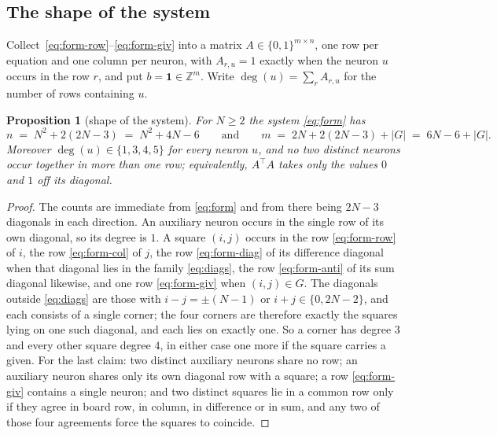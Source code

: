 \documentclass{easychair}
\newtheorem{proposition}[thm]{Proposition}
\begin{document}
\subsection*{The shape of the system}

Collect~\eqref{eq:form-row}--\eqref{eq:form-giv} into a matrix $A \in \{0,1\}^{m \times n}$,
one row per equation and one column per neuron, with $A_{r,u} = 1$ exactly when the neuron $u$
occurs in the row $r$, and put $b = \mathbf{1} \in \mathbb{Z}^{m}$. Write
$\deg(u) = \sum_{r} A_{r,u}$ for the number of rows containing $u$.

\begin{proposition}[shape of the system]\label{prop:sizes}
For $N \ge 2$ the system \eqref{eq:form} has
\begin{equation}\label{eq:sizes}
  n \;=\; N^{2} + 2(2N-3) \;=\; N^{2} + 4N - 6
  \qquad\text{and}\qquad
  m \;=\; 2N + 2(2N-3) + |G| \;=\; 6N - 6 + |G| .
\end{equation}
Moreover $\deg(u) \in \{1,3,4,5\}$ for every neuron $u$, and no two distinct neurons occur together
in more than one row; equivalently, $A^{\top}\!A$ takes only the values $0$ and $1$ off its
diagonal.
\end{proposition}

\begin{proof}
The counts are immediate from \eqref{eq:form} and from there being $2N-3$ diagonals in each
direction. An auxiliary neuron occurs in the single row of its own diagonal, so its degree is $1$. A
square $(i,j)$ occurs in the row \eqref{eq:form-row} of $i$, the row \eqref{eq:form-col} of $j$, the
row \eqref{eq:form-diag} of its difference diagonal when that diagonal lies in the family
\eqref{eq:diags}, the row \eqref{eq:form-anti} of its sum diagonal likewise, and one row
\eqref{eq:form-giv} when $(i,j) \in G$. The diagonals outside \eqref{eq:diags} are those with
$i - j = \pm(N-1)$ or $i + j \in \{0, 2N-2\}$, and each consists of a single corner; the four
corners are therefore exactly the squares lying on one such diagonal, and each lies on exactly one.
So a corner has degree $3$ and every other square degree $4$, in either case one more if the square
carries a given. For the last claim: two distinct auxiliary neurons share no row; an auxiliary
neuron shares only its own diagonal row with a square; a row \eqref{eq:form-giv} contains a single
neuron; and two distinct squares lie in a common row only if they agree in board row, in column, in
difference or in sum, and any two of those four agreements force the squares to coincide.
\end{proof}
\end{document}
